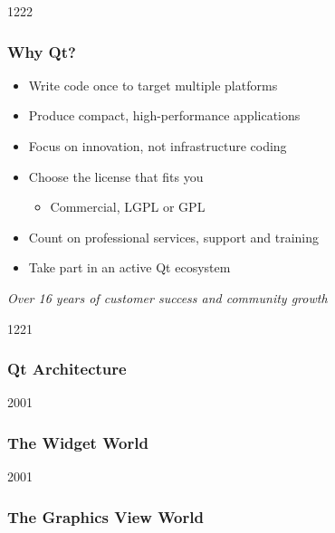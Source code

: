 
\begin{slide}{1222}
  \frametitle{Why Qt?}
  \begin{itemize}
  \item Write code once to target multiple platforms
  \item Produce compact, high-performance applications
  \item Focus on innovation, not infrastructure coding
  \item Choose the license that fits you
    \begin{itemize}
    \item Commercial, LGPL or GPL
    \end{itemize}
  \item Count on professional services, support and training
  \item Take part in an active Qt ecosystem
  \end{itemize}
  \vspace{1cm}
  \begin{block}{} {
      \textit{Over 16 years of customer success and community growth}
    }
  \end{block}
\end{slide}


\begin{slide}{1221}
  \frametitle{Qt Architecture}
  \vspace*{10mm}
\end{slide}


\begin{slide}{2001}\frametitle{The Widget World}

\end{slide}


\begin{slide}{2001}\frametitle{The Graphics View World}

\end{slide}

